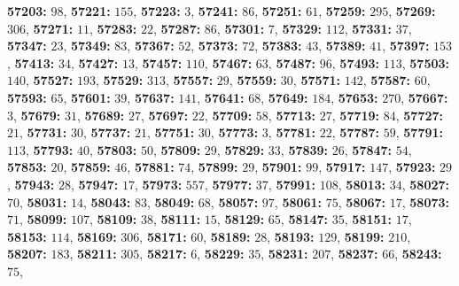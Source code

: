 \textsf{\bfseries 57203:} $98$, \textsf{\bfseries 57221:} $155$, \textsf{\bfseries 57223:} $3$, \textsf{\bfseries 57241:} $86$, \textsf{\bfseries 57251:} $61$, \textsf{\bfseries 57259:} $295$, \textsf{\bfseries 57269:} $306$, \textsf{\bfseries 57271:} $11$, \textsf{\bfseries 57283:} $22$, \textsf{\bfseries 57287:} $86$, \textsf{\bfseries 57301:} $7$, \textsf{\bfseries 57329:} $112$, \textsf{\bfseries 57331:} $37$, \textsf{\bfseries 57347:} $23$, \textsf{\bfseries 57349:} $83$, \textsf{\bfseries 57367:} $52$, \textsf{\bfseries 57373:} $72$, \textsf{\bfseries 57383:} $43$, \textsf{\bfseries 57389:} $41$, \textsf{\bfseries 57397:} $153$, \textsf{\bfseries 57413:} $34$, \textsf{\bfseries 57427:} $13$, \textsf{\bfseries 57457:} $110$, \textsf{\bfseries 57467:} $63$, \textsf{\bfseries 57487:} $96$, \textsf{\bfseries 57493:} $113$, \textsf{\bfseries 57503:} $140$, \textsf{\bfseries 57527:} $193$, \textsf{\bfseries 57529:} $313$, \textsf{\bfseries 57557:} $29$, \textsf{\bfseries 57559:} $30$, \textsf{\bfseries 57571:} $142$, \textsf{\bfseries 57587:} $60$, \textsf{\bfseries 57593:} $65$, \textsf{\bfseries 57601:} $39$, \textsf{\bfseries 57637:} $141$, \textsf{\bfseries 57641:} $68$, \textsf{\bfseries 57649:} $184$, \textsf{\bfseries 57653:} $270$, \textsf{\bfseries 57667:} $3$, \textsf{\bfseries 57679:} $31$, \textsf{\bfseries 57689:} $27$, \textsf{\bfseries 57697:} $22$, \textsf{\bfseries 57709:} $58$, \textsf{\bfseries 57713:} $27$, \textsf{\bfseries 57719:} $84$, \textsf{\bfseries 57727:} $21$, \textsf{\bfseries 57731:} $30$, \textsf{\bfseries 57737:} $21$, \textsf{\bfseries 57751:} $30$, \textsf{\bfseries 57773:} $3$, \textsf{\bfseries 57781:} $22$, \textsf{\bfseries 57787:} $59$, \textsf{\bfseries 57791:} $113$, \textsf{\bfseries 57793:} $40$, \textsf{\bfseries 57803:} $50$, \textsf{\bfseries 57809:} $29$, \textsf{\bfseries 57829:} $33$, \textsf{\bfseries 57839:} $26$, \textsf{\bfseries 57847:} $54$, \textsf{\bfseries 57853:} $20$, \textsf{\bfseries 57859:} $46$, \textsf{\bfseries 57881:} $74$, \textsf{\bfseries 57899:} $29$, \textsf{\bfseries 57901:} $99$, \textsf{\bfseries 57917:} $147$, \textsf{\bfseries 57923:} $29$, \textsf{\bfseries 57943:} $28$, \textsf{\bfseries 57947:} $17$, \textsf{\bfseries 57973:} $557$, \textsf{\bfseries 57977:} $37$, \textsf{\bfseries 57991:} $108$, \textsf{\bfseries 58013:} $34$, \textsf{\bfseries 58027:} $70$, \textsf{\bfseries 58031:} $14$, \textsf{\bfseries 58043:} $83$, \textsf{\bfseries 58049:} $68$, \textsf{\bfseries 58057:} $97$, \textsf{\bfseries 58061:} $75$, \textsf{\bfseries 58067:} $17$, \textsf{\bfseries 58073:} $71$, \textsf{\bfseries 58099:} $107$, \textsf{\bfseries 58109:} $38$, \textsf{\bfseries 58111:} $15$, \textsf{\bfseries 58129:} $65$, \textsf{\bfseries 58147:} $35$, \textsf{\bfseries 58151:} $17$, \textsf{\bfseries 58153:} $114$, \textsf{\bfseries 58169:} $306$, \textsf{\bfseries 58171:} $60$, \textsf{\bfseries 58189:} $28$, \textsf{\bfseries 58193:} $129$, \textsf{\bfseries 58199:} $210$, \textsf{\bfseries 58207:} $183$, \textsf{\bfseries 58211:} $305$, \textsf{\bfseries 58217:} $6$, \textsf{\bfseries 58229:} $35$, \textsf{\bfseries 58231:} $207$, \textsf{\bfseries 58237:} $66$, \textsf{\bfseries 58243:} $75$, 
